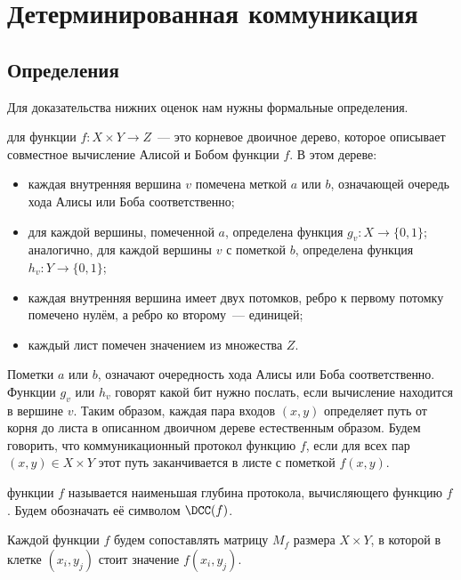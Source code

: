 \section{Детерминированная коммуникация}

\subsection{Определения}

Для доказательства нижних оценок нам нужны формальные определения.

\begin{definition}
     для функции $f\colon X \times Y \to Z$~--- это корневое двоичное
    дерево, которое описывает совместное вычисление Алисой и Бобом функции $f$. В этом дереве:
    \begin{itemize}
        \item каждая внутренняя вершина $v$ помечена меткой $a$ или $b$, означающей очередь хода Алисы
            или Боба соответственно;
        \item для каждой вершины, помеченной $a$, определена функция $g_v\colon X \to \{0, 1\}$;
            аналогично, для каждой вершины $v$ с пометкой $b$, определена функция $h_v\colon Y \to \{0,
            1\}$;
        \item каждая внутренняя вершина имеет двух потомков, ребро к первому потомку помечено нулём, а
            ребро ко второму~--- единицей;
        \item каждый лист помечен значением из множества $Z$.
    \end{itemize}

    Пометки $a$ или $b$, означают очередность хода Алисы или Боба соответственно. Функции $g_v$ или $h_v$
    говорят какой бит нужно послать, если вычисление находится в вершине $v$. Таким образом, каждая пара
    входов $(x, y)$ определяет путь от корня до листа в описанном двоичном дереве естественным
    образом. Будем говорить, что коммуникационный протокол  функцию $f$, если для всех
    пар $(x, y) \in X \times Y $ этот путь заканчивается в листе с пометкой $f(x, y)$.  
    
     функции $f$ называется наименьшая глубина протокола,
    вычисляющего функцию $f$. Будем обозначать её символом $\DCC(f)$.
    
    Каждой функции $f$ будем сопоставлять матрицу $M_f$ размера $X \times Y$, в которой в клетке $(x_i,
    y_j)$ стоит значение $f(x_i, y_j)$.
\end{definition}

